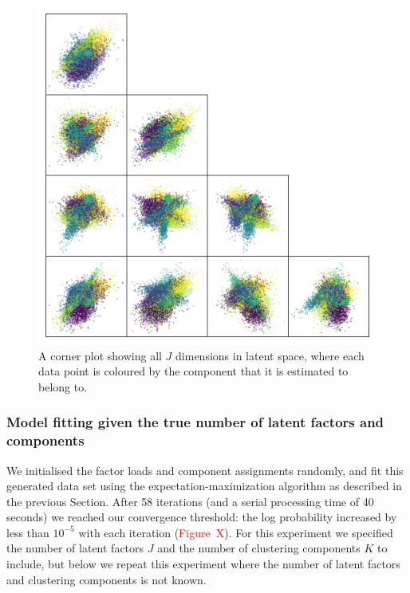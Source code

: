 \documentclass[twocolumn]{aastex61}
\newcommand{\todo}[1]{\textcolor{red}{#1}}
\newcommand{\NumLatentFactors}{J}
\newcommand{\NumComponents}{K}
\begin{document}
\begin{figure}
	\includegraphics[width=1.0\textwidth]{experiments/toy-model-latent-space.png}
    \caption{A corner plot showing all $\NumLatentFactors$ dimensions in
    		 latent space, where each data point is coloured by the component
		 	 that it is estimated to belong to.}
    \label{fig:toy-model-latent-space}
\end{figure}




\subsubsection{Model fitting given the true number of latent factors and components}

We initialised the factor loads and component assignments randomly, and
fit this generated data set using the expectation-maximization algorithm
as described in the previous Section. After 58 iterations
(and a serial processing time of 40 seconds) we
reached our convergence threshold: the log probability increased by
less than $10^{-5}$ with each iteration (\todo{Figure~X}). For this experiment we specified
the number of latent factors $\NumLatentFactors$ and the number of clustering components
$\NumComponents$ to include, but below we repeat this experiment where the number
of latent factors and clustering components is not known.
\end{document}
